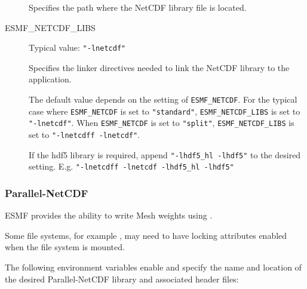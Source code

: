 \begin{description}
Specifies the path where the NetCDF library file is located.

\item[ESMF\_NETCDF\_LIBS] Typical value: {\tt "-lnetcdf"} 

Specifies the linker directives needed to link the NetCDF library to
the application.

The default value depends on the setting of {\tt ESMF\_NETCDF}.  For the 
typical case where {\tt ESMF\_NETCDF} is set to {\tt "standard"}, 
{\tt ESMF\_NETCDF\_LIBS} is set to {\tt "-lnetcdf"}.  
When {\tt ESMF\_NETCDF} is set to {\tt "split"}, {\tt ESMF\_NETCDF\_LIBS} 
is set to {\tt "-lnetcdff -lnetcdf"}.

If the hdf5 library is required, append {\tt "-lhdf5\_hl -lhdf5"} to the
desired setting.  E.g. {\tt "-lnetcdff -lnetcdf -lhdf5\_hl -lhdf5"}
\end{description}

\subsubsection{Parallel-NetCDF}
\label{sec:pnetcdf}
ESMF provides the ability to write Mesh weights using 
.

Some file systems, for example , may need
to have locking attributes enabled when the file system is mounted.

The following environment variables enable and specify the name and 
location of the desired Parallel-NetCDF library and associated header files:

